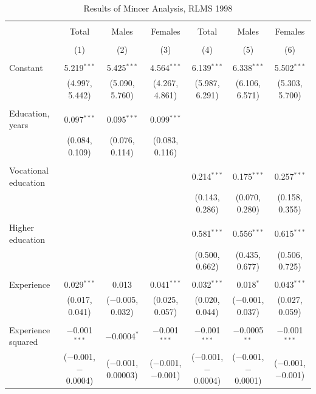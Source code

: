 \documentclass[12pt,a4paper]{article}
\numberwithin{equation}{section}
\begin{document}
\begin{landscape}
	
	\fontsize{9}{11}
	\selectfont
	
	\begin{table}[!htbp] \centering 
		\caption{Results of Mincer Analysis, RLMS 1998} 
		\label{} 
		\begin{tabular}{@{\extracolsep{5pt}}lcccccc} 
			\\[-1.8ex]\hline 
			\hline \\[-1.8ex] 
			& Total & Males & Females & Total & Males & Females \\ 
			\\[-1.8ex] & (1) & (2) & (3) & (4) & (5) & (6)\\ 
			\hline \\[-1.8ex] 
			Constant & 5.219$^{***}$ & 5.425$^{***}$ & 4.564$^{***}$ & 6.139$^{***}$ & 6.338$^{***}$ & 5.502$^{***}$ \\ 
			& (4.997, 5.442) & (5.090, 5.760) & (4.267, 4.861) & (5.987, 6.291) & (6.106, 6.571) & (5.303, 5.700) \\ 
			& & & & & & \\ 
			Education, years & 0.097$^{***}$ & 0.095$^{***}$ & 0.099$^{***}$ &  &  &  \\ 
			& (0.084, 0.109) & (0.076, 0.114) & (0.083, 0.116) &  &  &  \\ 
			& & & & & & \\ 
			Vocational education &  &  &  & 0.214$^{***}$ & 0.175$^{***}$ & 0.257$^{***}$ \\ 
			&  &  &  & (0.143, 0.286) & (0.070, 0.280) & (0.158, 0.355) \\ 
			& & & & & & \\ 
			Higher education &  &  &  & 0.581$^{***}$ & 0.556$^{***}$ & 0.615$^{***}$ \\ 
			&  &  &  & (0.500, 0.662) & (0.435, 0.677) & (0.506, 0.725) \\ 
			& & & & & & \\ 
			Experience & 0.029$^{***}$ & 0.013 & 0.041$^{***}$ & 0.032$^{***}$ & 0.018$^{*}$ & 0.043$^{***}$ \\ 
			& (0.017, 0.041) & ($-$0.005, 0.032) & (0.025, 0.057) & (0.020, 0.044) & ($-$0.001, 0.037) & (0.027, 0.059) \\ 
			& & & & & & \\ 
			Experience squared & $-$0.001$^{***}$ & $-$0.0004$^{*}$ & $-$0.001$^{***}$ & $-$0.001$^{***}$ & $-$0.0005$^{**}$ & $-$0.001$^{***}$ \\ 
			& ($-$0.001, $-$0.0004) & ($-$0.001, 0.00003) & ($-$0.001, $-$0.001) & ($-$0.001, $-$0.0004) & ($-$0.001, $-$0.0001) & ($-$0.001, $-$0.001) \\ 

\end{tabular}
\end{table}
\end{landscape}
\end{document}
